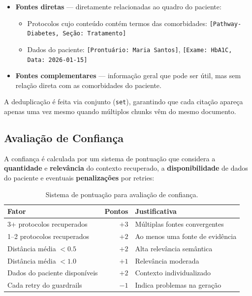 \begin{itemize}
    \item \textbf{Fontes diretas} --- diretamente relacionadas ao quadro do paciente:
    \begin{itemize}
        \item Protocolos cujo conteúdo contém termos das comorbidades: \texttt{[Pathway-Diabetes, Seção: Tratamento]}
        \item Dados do paciente: \texttt{[Prontuário: Maria Santos]}, \texttt{[Exame: HbA1C, Data: 2026-01-15]}
    \end{itemize}
    \item \textbf{Fontes complementares} --- informação geral que pode ser útil, mas sem relação direta com as comorbidades do paciente.
\end{itemize}

A deduplicação é feita via conjunto (\texttt{set}), garantindo que cada citação apareça apenas uma vez mesmo quando múltiplos chunks vêm do mesmo documento.

\subsection{Avaliação de Confiança}

A confiança é calculada por um sistema de pontuação que considera a \textbf{quantidade} e \textbf{relevância} do contexto recuperado, a \textbf{disponibilidade} de dados do paciente e eventuais \textbf{penalizações} por retries:

\begin{table}[H]
\centering
\caption{Sistema de pontuação para avaliação de confiança.}
\label{tab:confianca_scoring}
\begin{tabular}{l r l}
\toprule
\textbf{Fator} & \textbf{Pontos} & \textbf{Justificativa} \\
\midrule
3+ protocolos recuperados & $+3$ & Múltiplas fontes convergentes \\
1--2 protocolos recuperados & $+2$ & Ao menos uma fonte de evidência \\
Distância média $< 0.5$ & $+2$ & Alta relevância semântica \\
Distância média $< 1.0$ & $+1$ & Relevância moderada \\
Dados do paciente disponíveis & $+2$ & Contexto individualizado \\
Cada retry do guardrails & $-1$ & Indica problemas na geração \\
\bottomrule
\end{tabular}
\end{table}

